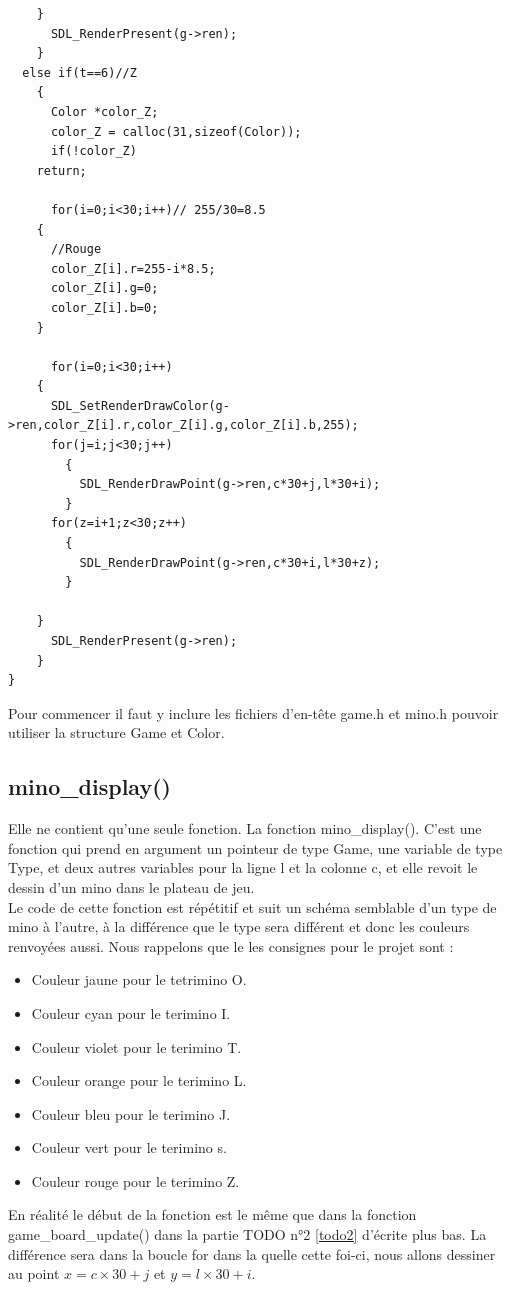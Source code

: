 \documentclass[a4paper,10p]{report}
\begin{document}
\begin{lstlisting}
	}
      SDL_RenderPresent(g->ren);
    }
  else if(t==6)//Z
    {
      Color *color_Z;
      color_Z = calloc(31,sizeof(Color));
      if(!color_Z)
	return;

      for(i=0;i<30;i++)// 255/30=8.5
	{
	  //Rouge
	  color_Z[i].r=255-i*8.5;
	  color_Z[i].g=0;
	  color_Z[i].b=0;
	}

      for(i=0;i<30;i++)
	{
	  SDL_SetRenderDrawColor(g->ren,color_Z[i].r,color_Z[i].g,color_Z[i].b,255);
	  for(j=i;j<30;j++)
	    {
	      SDL_RenderDrawPoint(g->ren,c*30+j,l*30+i);
	    }
	  for(z=i+1;z<30;z++)
	    {
	      SDL_RenderDrawPoint(g->ren,c*30+i,l*30+z);
	    }
	    
	}
      SDL_RenderPresent(g->ren);
    }
}
\end{lstlisting}
Pour commencer il faut y inclure les fichiers d'en-tête game.h et mino.h pouvoir utiliser la structure Game et Color.

\subsection{mino\_display()}
\label{mino_display}
Elle ne contient qu'une seule fonction. La fonction mino\_display(). C'est une fonction qui prend en argument un pointeur de type Game, une variable de type Type, et deux autres variables pour la ligne l et la colonne c, et elle revoit le dessin d'un mino dans le plateau de jeu.
\\Le code de cette fonction est répétitif et suit un schéma semblable d'un type de mino à l'autre, à la différence que le type sera différent et donc les couleurs renvoyées aussi. Nous rappelons que le les consignes pour le projet sont :
\begin{itemize}
    \item Couleur jaune pour le tetrimino O.
    \item Couleur cyan pour le terimino I.
    \item Couleur violet pour le terimino T.
    \item Couleur orange pour le terimino L.
    \item Couleur bleu pour le terimino J.
    \item Couleur vert pour le terimino s.
    \item Couleur rouge pour le terimino Z.
\end{itemize}
En réalité le début de la fonction est le même que dans la fonction game\_board\_update() dans la partie TODO n°2 \ref{todo2} d'écrite plus bas. La différence sera dans la boucle for dans la quelle cette foi-ci, nous allons dessiner au point $x=c\times30 + j$ et $y=l\times30+i$.
\end{document}
